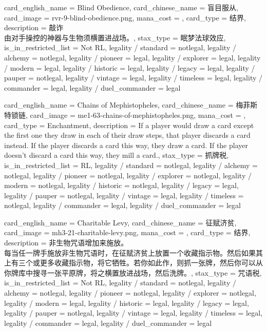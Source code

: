 \documentclass[lang = cn, color = black, 10pt]{AllThatStax}
\begin{document}
\card
{
	card_english_name = {Blind Obedience},
	card_chinese_name = {盲目服从},
	card_image = rvr-9-blind-obedience.png,
	mana_cost = ,
	card_type = 结界,
	description = {敲诈\\
		由对手操控的神器与生物须横置进战场。},
	stax_type = 眠梦法球效应,
	is_in_restricted_list = Not RL,
	legality / standard = notlegal,
	legality / alchemy = notlegal,
	legality / pioneer = legal,
	legality / explorer = legal,
	legality / modern = legal,
	legality / historic = legal,
	legality / legacy = legal,
	legality / pauper = notlegal,
	legality / vintage = legal,
	legality / timeless = legal,
	legality / commander = legal,
	legality / duel_commander = legal
}

\card
{
	card_english_name = {Chains of Mephistopheles},
	card_chinese_name = {梅菲斯特锁链},
	card_image = me1-63-chains-of-mephistopheles.png,
	mana_cost = ,
	card_type = Enchantment,
	description = {If a player would draw a card except the first one they draw in each of their draw steps, that player discards a card instead. If the player discards a card this way, they draw a card. If the player doesn't discard a card this way, they mill a card.},
	stax_type = 抓牌税,
	is_in_restricted_list = RL,
	legality / standard = notlegal,
	legality / alchemy = notlegal,
	legality / pioneer = notlegal,
	legality / explorer = notlegal,
	legality / modern = notlegal,
	legality / historic = notlegal,
	legality / legacy = legal,
	legality / pauper = notlegal,
	legality / vintage = legal,
	legality / timeless = notlegal,
	legality / commander = legal,
	legality / duel_commander = legal
}

\card
{
	card_english_name = {Charitable Levy},
	card_chinese_name = {征赋济贫},
	card_image = mh3-21-charitable-levy.png,
	mana_cost = ,
	card_type = 结界,
	description = {非生物咒语增加来施放。\\
		每当任一牌手施放非生物咒语时，在征赋济贫上放置一个收藏指示物。然后如果其上有三个或更多收藏指示物，将它牺牲。若你如此作，则抓一张牌，然后你可以从你牌库中搜寻一张平原牌，将之横置放进战场，然后洗牌。},
	stax_type = 咒语税,
	is_in_restricted_list = Not RL,
	legality / standard = notlegal,
	legality / alchemy = notlegal,
	legality / pioneer = notlegal,
	legality / explorer = notlegal,
	legality / modern = legal,
	legality / historic = legal,
	legality / legacy = legal,
	legality / pauper = notlegal,
	legality / vintage = legal,
	legality / timeless = legal,
	legality / commander = legal,
	legality / duel_commander = legal
}
\end{document}
